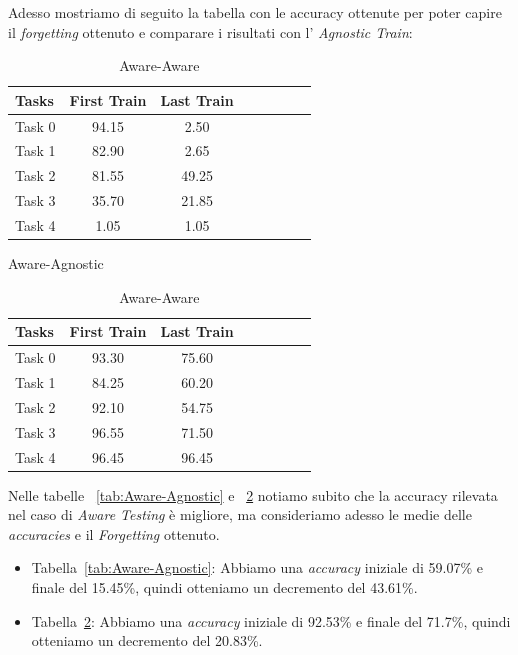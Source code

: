 Adesso mostriamo di seguito la tabella con le accuracy ottenute per poter capire il \textit{forgetting} ottenuto e comparare i risultati con l' \textit{Agnostic Train}:
\begin{table}[!htb]
\begin{minipage}{.5\linewidth}
    \centering

    \label{tab:Aware-Agnostic }

    \medskip

\begin{tabular}{l*{6}{c}r}
Tasks   & First Train & Last Train\\
\hline
   Task 0      &     94.15      &       2.50\\
   Task 1      &     82.90      &       2.65\\
   Task 2      &     81.55      &      49.25\\
   Task 3      &     35.70      &      21.85\\
   Task 4      &      1.05      &       1.05\\
\end{tabular}
\caption{Aware-Agnostic}
\label{tab:Aware-Agnostic}
\end{minipage}\hfill
\begin{minipage}{.5\linewidth}
    \centering

    \label{tab:Aware-Aware}

    \medskip

\begin{tabular}{l*{6}{c}r}
Tasks   & First Train  & Last Train\\
\hline
   Task 0      &     93.30      &      75.60\\
   Task 1      &     84.25      &      60.20\\
   Task 2      &     92.10      &      54.75\\
   Task 3      &     96.55      &      71.50\\
   Task 4      &     96.45      &      96.45\\
\end{tabular}
\caption{Aware-Aware}
\label{tab:Aware-Aware}
\end{minipage}
\end{table}
\newline
Nelle tabelle ~\ref{tab:Aware-Agnostic} e ~\ref{tab:Aware-Aware} notiamo subito che la accuracy rilevata nel caso di \textit{Aware Testing} è migliore, ma consideriamo adesso le medie delle \textit{accuracies} e il \textit{Forgetting} ottenuto.
\begin{itemize}
    \item Tabella~\ref{tab:Aware-Agnostic}: Abbiamo una \textit{accuracy} iniziale di 59.07\% e finale del 15.45\%, quindi otteniamo un decremento del 43.61\%.
    \item Tabella~\ref{tab:Aware-Aware}: Abbiamo una \textit{accuracy} iniziale di 92.53\% e finale del 71.7\%, quindi otteniamo un decremento del 20.83\%.
\end{itemize}
